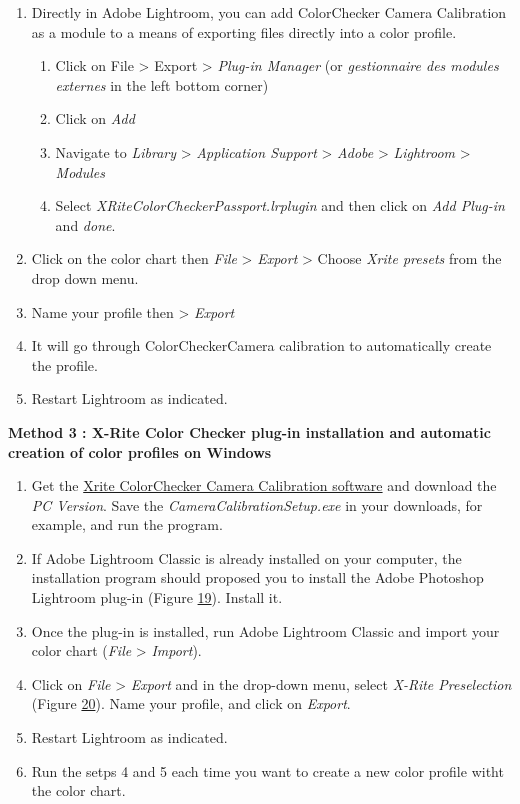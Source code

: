 \documentclass[
]{book}
\begin{document}
\begin{enumerate}
\def\labelenumi{\arabic{enumi}.}
\item
  Directly in Adobe Lightroom, you can add ColorChecker Camera
  Calibration as a module to a means of exporting files directly into
  a color profile.

  \begin{enumerate}
  \def\labelenumii{\arabic{enumii}.}
  \item
    Click on File \textgreater{} Export \textgreater{} \emph{Plug-in Manager} (or \emph{gestionnaire
    des modules externes} in the left bottom corner)
  \item
    Click on \emph{Add}
  \item
    Navigate to \emph{Library} \textgreater{} \emph{Application Support} \textgreater{} \emph{Adobe} \textgreater{}
    \emph{Lightroom} \textgreater{} \emph{Modules}
  \item
    Select \emph{XRiteColorCheckerPassport.lrplugin} and then click on
    \emph{Add Plug-in} and \emph{done}.
  \end{enumerate}
\item
  Click on the color chart then \emph{File} \textgreater{} \emph{Export} \textgreater{} Choose \emph{Xrite
  presets} from the drop down menu.
\item
  Name your profile then \textgreater{} \emph{Export}
\item
  It will go through ColorCheckerCamera calibration to automatically
  create the profile.
\item
  Restart Lightroom as indicated.
\end{enumerate}

\textbf{Method 3 : X-Rite Color Checker plug-in installation and automatic
creation of color profiles on Windows}

\begin{enumerate}
\def\labelenumi{\arabic{enumi}.}
\item
  Get the \href{https://xritephoto.com/ph_product_overview.aspx?ID=938\&Action=Support\&SoftwareID=2030}{Xrite ColorChecker Camera Calibration
  software}
  and download the \emph{PC Version}. Save the \emph{CameraCalibrationSetup.exe}
  in your downloads, for example, and run the program.
\item
  If Adobe Lightroom Classic is already installed on your computer,
  the installation program should proposed you to install the Adobe
  Photoshop Lightroom plug-in (Figure
  \protect\hyperlink{color_checker_plug_in_win}{19}). Install it.
\item
  Once the plug-in is installed, run Adobe Lightroom Classic and
  import your color chart (\emph{File} \textgreater{} \emph{Import}).
\item
  Click on \emph{File} \textgreater{} \emph{Export} and in the drop-down menu, select
  \emph{X-Rite Preselection} (Figure
  \protect\hyperlink{x_rite_preselection}{20}). Name your profile, and click on
  \emph{Export}.
\item
  Restart Lightroom as indicated.
\item
  Run the setps 4 and 5 each time you want to create a new color
  profile witht the color chart.
\end{enumerate}
\end{document}
